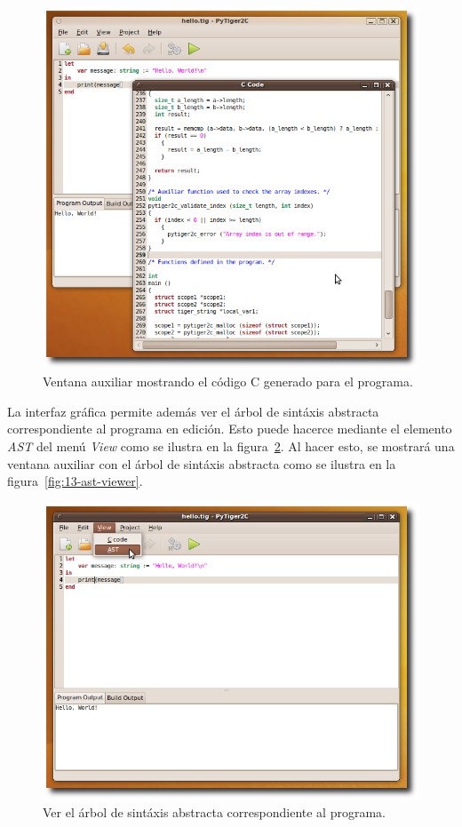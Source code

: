 \documentclass{article}
\begin{document}
\begin{figure}[htb]
  \centering
  \includegraphics[width=5.5in]{gui/11-code-viewer}
  \caption{Ventana auxiliar mostrando el código C generado para el programa.}
  \label{fig:11-code-viewer}
\end{figure}

\newpage

La interfaz gráfica permite además ver el árbol de sintáxis abstracta
correspondiente al programa en edición. Esto puede hacerce mediante el
elemento \emph{AST} del menú \emph{View} como se ilustra en la
figura~\ref{fig:12-viewing-ast}. Al hacer esto, se mostrará una ventana
auxiliar con el árbol de sintáxis abstracta como se ilustra en la
figura~\ref{fig:13-ast-viewer}.

\begin{figure}[htb]
  \centering
  \includegraphics[width=5.5in]{gui/12-viewing-ast}
  \caption{Ver el árbol de sintáxis abstracta correspondiente al programa.}
  \label{fig:12-viewing-ast}
\end{figure}
\end{document}

